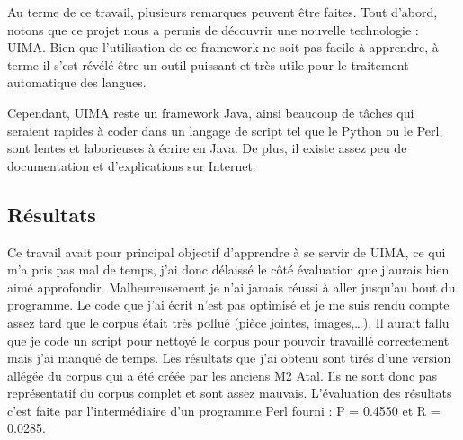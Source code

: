 \documentclass[a4paper]{article}
\begin{document}
	Au terme de ce travail, plusieurs remarques peuvent être faites. Tout d'abord, notons que ce projet nous a permis de découvrir une nouvelle technologie : UIMA. Bien que l'utilisation de ce framework ne soit pas facile à apprendre, à terme il s'est révélé être un outil puissant et très utile pour le traitement automatique des langues. 

	Cependant, UIMA reste un framework Java, ainsi beaucoup de tâches qui seraient rapides à coder dans un langage de script tel que le Python ou le Perl, sont lentes et laborieuses à écrire en Java. De plus, il existe assez peu de documentation et d'explications sur Internet.

	\subsection*{Résultats}
	Ce travail avait pour principal objectif d'apprendre à se servir de UIMA, ce qui m'a pris pas mal de temps, j'ai donc délaissé le côté évaluation que j'aurais bien aimé approfondir. Malheureusement je n'ai jamais réussi à aller jusqu'au bout du programme. Le code que j'ai écrit n'est pas optimisé et je me suis rendu compte assez tard que le corpus était très pollué (pièce jointes, images,\dots). Il aurait fallu que je code un script pour nettoyé le corpus pour pouvoir travaillé correctement mais j'ai manqué de temps. Les résultats que j'ai obtenu sont tirés d'une version allégée du corpus qui a été créée par les anciens M2 Atal. Ils ne sont donc pas représentatif du corpus complet et sont assez mauvais. L'évaluation des résultats c'est faite par l'intermédiaire d'un programme Perl fourni : P = 0.4550 et R = 0.0285. 

	
\end{document}
